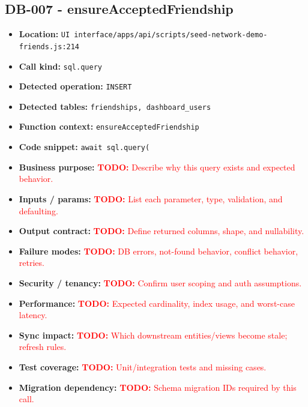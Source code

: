 \documentclass[11pt]{article}
\newcommand{\todoitem}[1]{\textcolor{red}{\textbf{TODO:} #1}}
\begin{document}
\subsection{DB-007 - ensureAcceptedFriendship}
\begin{itemize}[leftmargin=1.5em]
\item \textbf{Location:} \texttt{UI interface/apps/api/scripts/seed-network-demo-friends.js:214}
\item \textbf{Call kind:} \texttt{sql.query}
\item \textbf{Detected operation:} \texttt{INSERT}
\item \textbf{Detected tables:} \texttt{friendships, dashboard\_users}
\item \textbf{Function context:} \texttt{ensureAcceptedFriendship}
\item \textbf{Code snippet:} \texttt{await sql.query(}
\item \textbf{Business purpose:} \todoitem{Describe why this query exists and expected behavior.}
\item \textbf{Inputs / params:} \todoitem{List each parameter, type, validation, and defaulting.}
\item \textbf{Output contract:} \todoitem{Define returned columns, shape, and nullability.}
\item \textbf{Failure modes:} \todoitem{DB errors, not-found behavior, conflict behavior, retries.}
\item \textbf{Security / tenancy:} \todoitem{Confirm user scoping and auth assumptions.}
\item \textbf{Performance:} \todoitem{Expected cardinality, index usage, and worst-case latency.}
\item \textbf{Sync impact:} \todoitem{Which downstream entities/views become stale; refresh rules.}
\item \textbf{Test coverage:} \todoitem{Unit/integration tests and missing cases.}
\item \textbf{Migration dependency:} \todoitem{Schema migration IDs required by this call.}
\end{itemize}
\end{document}
